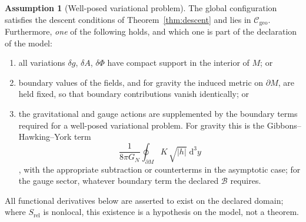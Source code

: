 \documentclass[11pt,a4paper]{article}
\theoremstyle{plain}
\theoremstyle{definition}
\newtheorem{assumption}[theorem]{Assumption}
\theoremstyle{remark}
\newcommand{\Cgeo}{\mathcal{C}_{\mathrm{geo}}}
\begin{document}
\begin{assumption}[Well-posed variational problem]
\label{ass:variational}
The global configuration satisfies the descent conditions of Theorem~\ref{thm:descent} and lies in
$\Cgeo$. Furthermore, \emph{one} of the following holds, and which one is part of the declaration of
the model:
\begin{enumerate}[label=(V\arabic*),leftmargin=2.8em]
\item\label{V1} all variations $\delta g$, $\delta A$, $\delta\Phi$ have compact support in the
      interior of $M$; or
\item\label{V2} boundary values of the fields, and for gravity the induced metric on $\partial M$,
      are held fixed, so that boundary contributions vanish identically; or
\item\label{V3} the gravitational and gauge actions are supplemented by the boundary terms required
      for a well-posed variational problem. For gravity this is the Gibbons--Hawking--York
      term
      \[
      \frac{1}{8\pi G_N}\oint_{\partial M} K\,\sqrt{|h|}\;\mathrm{d}^3y
      \]
      \cite{York1972,GibbonsHawking1977}, with the appropriate subtraction or counterterms in
      the asymptotic case; for the gauge sector, whatever boundary term the declared $\mathcal{B}$
      requires.
\end{enumerate}
All functional derivatives below are asserted to exist on the declared domain; where
$S_{\mathrm{rel}}$ is nonlocal, this existence is a hypothesis on the model, not a theorem.
\end{assumption}
\end{document}
